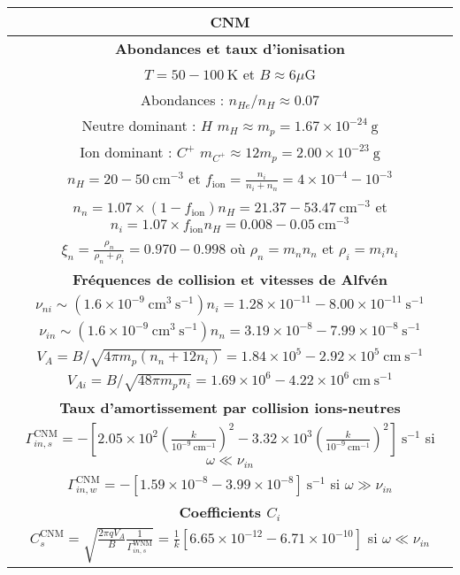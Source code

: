 \documentclass[10pt,a4paper]{article}
\begin{document}
\begin{center}
\begin{tabular}{|c|}
\hline
CNM \\
\hline
\hline  
\bf{Abondances et taux d'ionisation}\\ 
\hline
$T = 50 - 100~\mathrm{K}$ et $B \approx 6 \mu\mathrm{G}$ \\  
Abondances : $n_{He}/n_H \approx 0.07$ \\ 
Neutre dominant : $H$ $m_H \approx m_p = 1.67 \times 10^{-24}~\mathrm{g}$ \\ 
Ion dominant : $C^+$ $m_{C^+} \approx 12m_p = 2.00 \times 10^{-23}~\mathrm{g}$    \\
\hline
$n_H = 20 - 50~\mathrm{cm}^{-3}$ et $f_\mathrm{ion} = \frac{n_i}{n_i+n_n} = 4\times 10^{-4} - 10^{-3}$ \\ 
$n_n = 1.07\times (1-f_\mathrm{ion})n_H = 21.37-53.47~\mathrm{cm}^{-3}$ et $n_i = 1.07 \times f_\mathrm{ion}n_H = 0.008 - 0.05~\mathrm{cm}^{-3}$ \\
$\xi_n = \frac{\rho_n}{\rho_n+\rho_i} = 0.970 - 0.998$ où $\rho_n = m_n n_n$ et $\rho_i = m_i n_i$ \\ 
\hline
\hline
\bf{Fréquences de collision et vitesses de Alfvén}\\
\hline
$\nu_{ni} \sim (1.6\times 10^{-9}~\mathrm{cm}^3~\mathrm{s}^{-1}) n_i = 1.28\times 10^{-11} - 8.00\times 10^{-11}~\mathrm{s}^{-1}$ \\ 
$\nu_{in} \sim (1.6\times 10^{-9}~\mathrm{cm}^3~\mathrm{s}^{-1}) n_n = 3.19\times 10^{-8} - 7.99\times 10^{-8}~\mathrm{s}^{-1}$ \\ 
\hline 
$V_A = B/\sqrt{4\pi m_p (n_n +12n_i)} = 1.84\times 10^5 - 2.92 \times 10^5 ~\mathrm{cm}~\mathrm{s}^{-1}$ \\ 
$V_{Ai} = B/\sqrt{48\pi m_p n_i} = 1.69\times 10^6 - 4.22\times 10^6~\mathrm{cm}~\mathrm{s}^{-1}$ \\ 
\hline 
\hline
\bf{Taux d'amortissement par collision ions-neutres} \\ 
\hline
$\Gamma^\mathrm{CNM}_{in,s} = - \left[ 2.05\times 10^{2} \left( \frac{k}{10^{-9}~\mathrm{cm}^{-1}} \right)^2 - 3.32\times 10^{3} \left( \frac{k}{10^{-9}~\mathrm{cm}^{-1}} \right)^2 \right]~\mathrm{s}^{-1}$ si $\omega \ll \nu_{in}$ \\ 
$\Gamma^\mathrm{CNM}_{in,w} = - \left[ 1.59\times 10^{-8} - 3.99 \times 10^{-8} \right]~\mathrm{s}^{-1}$ si $\omega \gg \nu_{in}$ \\
\hline
\hline
\bf{Coefficients $C_i$} \\
\hline
$C^\mathrm{CNM}_s = \sqrt{\frac{2\pi qV_A}{B} \frac{1}{\Gamma^\mathrm{WNM}_{in,s}}} = \frac{1}{k} [ 6.65 \times 10^{-12} - 6.71 \times 10^{-10} ]$ si $\omega \ll \nu_{in}$ \\ 

\end{tabular}
\end{center}
\end{document}
